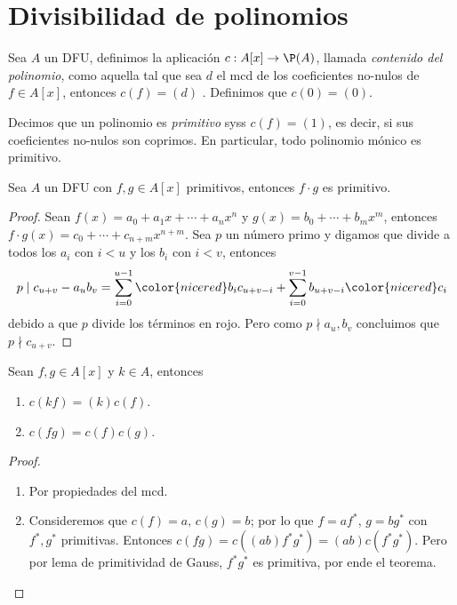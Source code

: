 \documentclass[11pt,oneside]{book}
\begin{document}
\section{Divisibilidad de polinomios}
\begin{mydef}[Contenido]
Sea $A$ un DFU, definimos la aplicación $c:A[x]\rightarrow\P(A)$, llamada \textit{contenido del polinomio}, como aquella tal que sea $d$ el mcd de los coeficientes no-nulos de $f\in A[x]$, entonces $c(f)=(d)$ . Definimos que $c(0)=(0)$.

Decimos que un polinomio es \textit{primitivo} syss $c(f)=(1)$, es decir, si sus coeficientes no-nulos son coprimos. En particular, todo polinomio mónico es primitivo.
\end{mydef}
\begin{lem}
Sea $A$ un DFU con $f,g\in A[x]$ primitivos, entonces $f\cdot g$ es primitivo.
\end{lem}
\begin{proof}
Sean $f(x)=a_0+a_1x+\cdots+a_nx^n$ y $g(x)=b_0+\cdots+b_mx^m$, entonces $f\cdot g(x)=c_0+\cdots+c_{n+m}x^{n+m}$. Sea $p$ un número primo y digamos que divide a todos los $a_i$ con $i\lt u$ y los $b_i$ con $i\lt v$, entonces
$$p\mid c_{u+v}-a_ub_v=\sum_{i=0}^{u-1}{\color{nicered}b_i}c_{u+v-i}+\sum_{i=0}^{v-1}b_{u+v-i}{\color{nicered}c_i}$$
debido a que $p$ divide los términos en rojo. Pero como $p\nmid a_u,b_v$ concluimos que $p\nmid c_{u+v}$.
\end{proof}
\begin{thm}
Sean $f,g\in A[x]$ y $k\in A$, entonces
\begin{enumerate}[$a)$]
	\item $c(kf)=(k)c(f)$.
	\item $c(fg)=c(f)c(g)$.
\end{enumerate}
\end{thm}
\begin{proof}
	\begin{enumerate}[$a)$]
	\item Por propiedades del mcd.
	\item Consideremos que $c(f)=a,\,c(g)=b$; por lo que $f=af^*$, $g=bg^*$ con $f^*,g^*$ primitivas. Entonces $c(fg)=c((ab)f^*g^*)=(ab)c(f^*g^*)$. Pero por lema de primitividad de Gauss, $f^*g^*$ es primitiva, por ende el teorema.
	\end{enumerate}
\end{proof}
\end{document}

